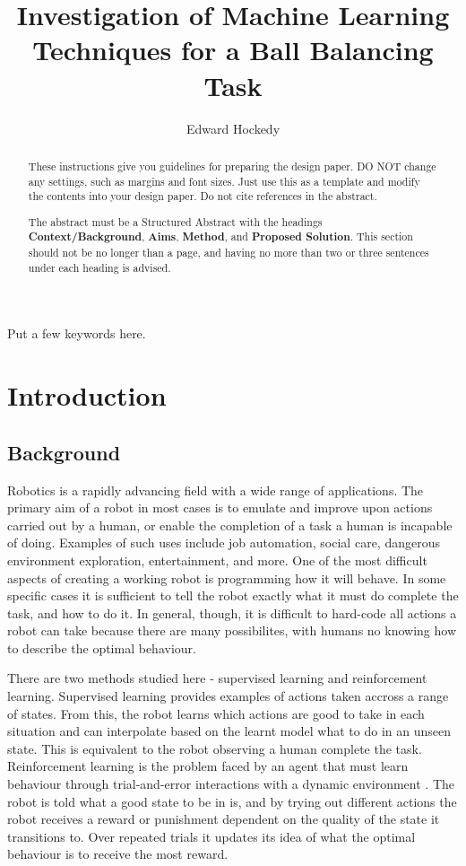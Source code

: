 \documentclass[12pt,a4paper]{article}
\title{Investigation of Machine Learning Techniques for a Ball Balancing Task}
\author{Edward Hockedy}
\date{}
\begin{document}
\maketitle

\begin{abstract}
These instructions give you guidelines for preparing the design paper.  DO NOT change any settings, such as margins and font sizes.  Just use this as a template and modify the contents into your design paper.  Do not cite references in the abstract.

The abstract must be a Structured Abstract with the headings {\bf Context/Background}, {\bf Aims}, {\bf Method}, and {\bf Proposed Solution}.  This section should not be no longer than a page, and having no more than two or three sentences under each heading is advised.
\end{abstract}

\begin{keywords}
Put a few keywords here.
\end{keywords}

\section{Introduction}
\subsection{Background}
Robotics is a rapidly advancing field with a wide range of applications. The primary aim of a robot in most cases is to emulate and improve upon actions carried out by a human, or enable the completion of a task a human is incapable of doing. Examples of such uses include job automation, social care, dangerous environment exploration, entertainment, and more. One of the most difficult aspects of creating a working robot is programming how it will behave. In some specific cases it is sufficient to tell the robot exactly what it must do complete the task, and how to do it. In general, though, it is difficult to hard-code all actions a robot can take because there are many possibilites, with humans no knowing how to describe the optimal behaviour. 

There are two methods studied here - supervised learning and reinforcement learning. Supervised learning provides examples of actions taken accross a range of states. From this, the robot learns which actions are good to take in each situation and can interpolate based on the learnt model what to do in an unseen state. This is equivalent to the robot observing a human complete the task. Reinforcement learning is the problem faced by an agent that must learn behaviour through trial-and-error interactions with a dynamic environment \cite{rl_survey}. The robot is told what a good state to be in is, and by trying out different actions the robot receives a reward or punishment dependent on the quality of the state it transitions to. Over repeated trials it updates its idea of what the optimal behaviour is to receive the most reward.
\end{document}
